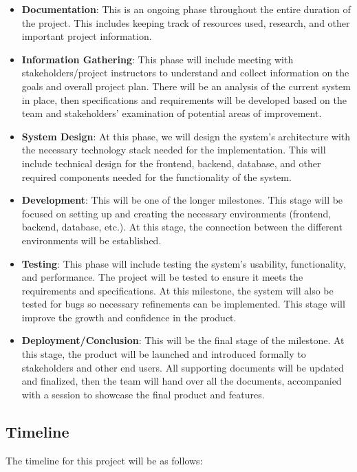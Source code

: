 \documentclass{article}
\begin{document}
\begin{itemize}
    \item \textbf{Documentation}: This is an ongoing phase throughout the entire duration of the project. This includes keeping track of resources used, research, and other important project information.
    \item \textbf{Information Gathering}: This phase will include meeting with stakeholders/project instructors to understand and collect information on the goals and overall project plan. There will be an analysis of the current system in place, then specifications and requirements will be developed based on the team and stakeholders' examination of potential areas of improvement.
    \item \textbf{System Design}: At this phase, we will design the system's architecture with the necessary technology stack needed for the implementation. This will include technical design for the frontend, backend, database, and other required components needed for the functionality of the system.
    \item \textbf{Development}: This will be one of the longer milestones. This stage will be focused on setting up and creating the necessary environments (frontend, backend, database, etc.). At this stage, the connection between the different environments will be established.
    \item \textbf{Testing}: This phase will include testing the system's usability, functionality, and performance. The project will be tested to ensure it meets the requirements and specifications. At this milestone, the system will also be tested for bugs so necessary refinements can be implemented. This stage will improve the growth and confidence in the product.
    \item \textbf{Deployment/Conclusion}: This will be the final stage of the milestone. At this stage, the product will be launched and introduced formally to stakeholders and other end users. All supporting documents will be updated and finalized, then the team will hand over all the documents, accompanied with a session to showcase the final product and features.
\end{itemize}

\subsection{Timeline}
The timeline for this project will be as follows:
\end{document}
